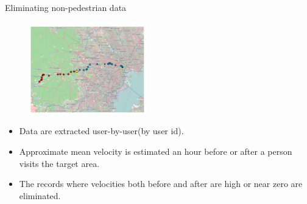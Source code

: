 \begin{frame}{Eliminating non-pedestrian data}

\begin{figure}
\includegraphics[height = 4cm]{pic6.png} 
\end{figure}

\begin{itemize}
\itemsep1pt\parskip0pt
\item
  Data are extracted user-by-user(by user id).
\item
  Approximate mean velocity is estimated an hour before or after a
  person visits the target area.
\item
  The records where velocities both before and after are high or near
  zero are eliminated.
\end{itemize}

\end{frame}
